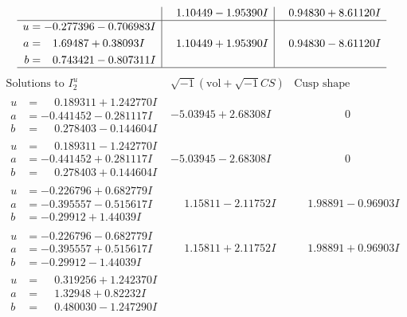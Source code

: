 \documentclass[1p]{elsarticle_modified}
\theoremstyle{definition}
\newcommand{\I}{\sqrt{-1}}
\begin{document}
$$\begin{array}{c|c|c}
 & \phantom{-}1.10449 - 1.95390 I & \phantom{-}0.94830 + 8.61120 I \\ \hline\begin{aligned}
u &= -0.277396 - 0.706983 I \\
a &= \phantom{-}1.69487 + 0.38093 I \\
b &= \phantom{-}0.743421 - 0.807311 I\end{aligned}
 & \phantom{-}1.10449 + 1.95390 I & \phantom{-}0.94830 - 8.61120 I\\
 \hline 
 \end{array}$$\newpage$$\begin{array}{c|c|c}  
\text{Solutions to }I^u_{2}& \I (\text{vol} + \sqrt{-1}CS) & \text{Cusp shape}\\
 \hline 
\begin{aligned}
u &= \phantom{-}0.189311 + 1.242770 I \\
a &= -0.441452 - 0.281117 I \\
b &= \phantom{-}0.278403 - 0.144604 I\end{aligned}
 & -5.03945 + 2.68308 I & \phantom{-0.000000 } 0 \\ \hline\begin{aligned}
u &= \phantom{-}0.189311 - 1.242770 I \\
a &= -0.441452 + 0.281117 I \\
b &= \phantom{-}0.278403 + 0.144604 I\end{aligned}
 & -5.03945 - 2.68308 I & \phantom{-0.000000 } 0 \\ \hline\begin{aligned}
u &= -0.226796 + 0.682779 I \\
a &= -0.395557 - 0.515617 I \\
b &= -0.29912 + 1.44039 I\end{aligned}
 & \phantom{-}1.15811 - 2.11752 I & \phantom{-}1.98891 - 0.96903 I \\ \hline\begin{aligned}
u &= -0.226796 - 0.682779 I \\
a &= -0.395557 + 0.515617 I \\
b &= -0.29912 - 1.44039 I\end{aligned}
 & \phantom{-}1.15811 + 2.11752 I & \phantom{-}1.98891 + 0.96903 I \\ \hline\begin{aligned}
u &= \phantom{-}0.319256 + 1.242370 I \\
a &= \phantom{-}1.32948 + 0.82232 I \\
b &= \phantom{-}0.480030 - 1.247290 I\end{aligned}

\end{array}$$
\end{document}
